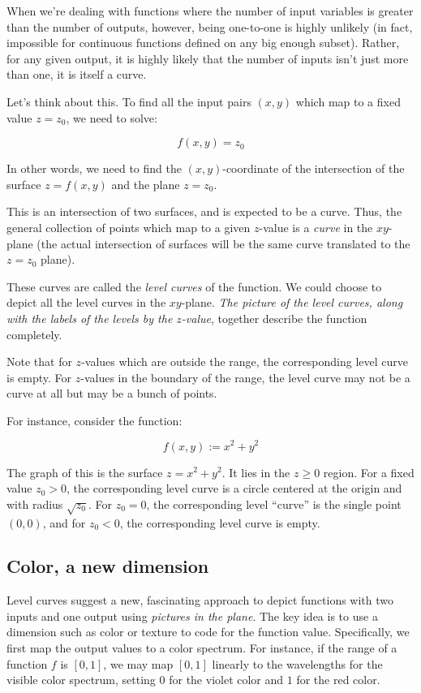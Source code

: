 \documentclass[10pt]{amsart}
\begin{document}
When we're dealing with functions where the number of input variables
is greater than the number of outputs, however, being one-to-one is
highly unlikely (in fact, impossible for continuous functions defined
on any big enough subset). Rather, for any given output, it is highly
likely that the number of inputs isn't just more than one, it is
itself a curve.

Let's think about this. To find all the input pairs $(x,y)$ which map
to a fixed value $z = z_0$, we need to solve:

$$f(x,y) = z_0$$

In other words, we need to find the $(x,y)$-coordinate of the
intersection of the surface $z = f(x,y)$ and the plane $z = z_0$.

This is an intersection of two surfaces, and is expected to be a
curve. Thus, the general collection of points which map to a given
$z$-value is a {\em curve} in the $xy$-plane (the actual intersection
of surfaces will be the same curve translated to the $z = z_0$ plane).

These curves are called the {\em level curves} of the function. We
could choose to depict all the level curves in the $xy$-plane. {\em
The picture of the level curves, along with the labels of the levels
by the $z$-value}, together describe the function completely.

Note that for $z$-values which are outside the range, the
corresponding level curve is empty. For $z$-values in the boundary of
the range, the level curve may not be a curve at all but may be a
bunch of points.

For instance, consider the function:

$$f(x,y) := x^2 + y^2$$

The graph of this is the surface $z = x^2 + y^2$. It lies in the $z
\ge 0$ region. For a fixed value $z_0 > 0$, the corresponding level
curve is a circle centered at the origin and with radius
$\sqrt{z_0}$. For $z_0 = 0$, the corresponding level ``curve'' is the
single point $(0,0)$, and for $z_0 < 0$, the corresponding level curve
is empty.

\subsection{Color, a new dimension}

Level curves suggest a new, fascinating approach to depict functions
with two inputs and one output using {\em pictures in the plane}. The
key idea is to use a dimension such as color or texture to code for
the function value. Specifically, we first map the output values to a
color spectrum. For instance, if the range of a function $f$ is $[0,1]$,
we may map $[0,1]$ linearly to the wavelengths for the visible color
spectrum, setting $0$ for the violet color and $1$ for the red color.
\end{document}
